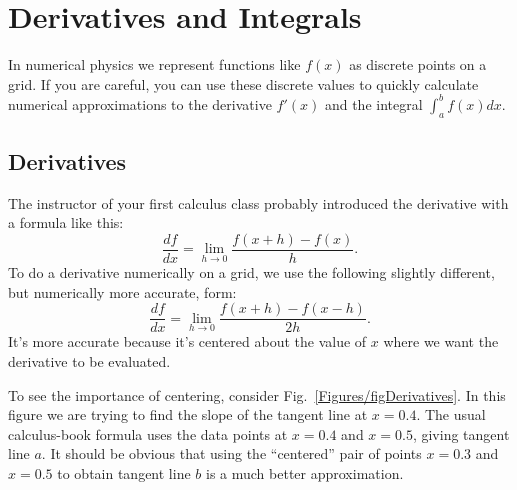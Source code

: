 \chapter{Derivatives and Integrals}

\label{chap:Calculus}

In numerical physics we represent functions like $f(x)$ as discrete points on
a grid.  If you are careful, you can use these discrete values to quickly
calculate numerical approximations to the derivative $f'(x)$ and the integral
$\int_a^b f(x) dx$.

\medskip

\section{Derivatives}

The instructor of your first calculus class probably introduced the
derivative with a formula like this:
\begin{equation}
    \frac{df}{dx} =
    \lim_{ h \rightarrow 0} \frac{f(x+h)-f(x) }{ h} .
\end{equation}
To do a derivative numerically on a grid, we use the following slightly
different, but numerically more accurate, form:
\begin{equation}
\frac{df }{ dx} = \lim_{ h \rightarrow 0} \frac{f(x+h)-f(x-h) }{ 2 h} .
\end{equation}
It's more accurate because it's centered about the value of $x$ where we want
the derivative to be evaluated.


To see the importance of centering, consider Fig.~\ref{Figures/figDerivatives}. In
this figure we are trying to find the slope of the tangent line at $x=0.4$.
The usual calculus-book formula uses the data points at $x=0.4$ and $x=0.5$,
giving tangent line $a$. It should be obvious that using the ``centered''
pair of points $x=0.3$ and $x=0.5$ to obtain tangent line $b$ is a much
better approximation.


